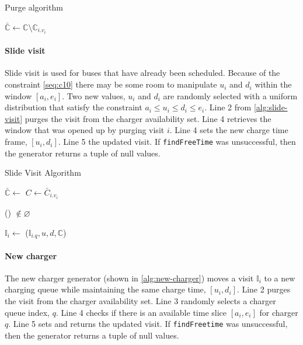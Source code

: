 \documentclass[11pt,a4paper,final]{article}
\newcommand{\I}{\mathbb{I}}                 %
\newcommand{\C}{\mathbb{C}}                 %
\newcommand{\Sol}{\mathbb{S}}               %
\begin{document}
\begin{algorithm}[H]
  \caption{Purge algorithm} \label{alg:purge}
    \LinesNumbered
    \KwIn{$\Sol$}
    \KwOut{$\bar{\Sol}$}

    \Begin
    {
        $\bar{\C} \leftarrow \C \setminus \C_{i.v_i}$
        \Return{$\bar{\C}$}
    }
  \end{algorithm}

\paragraph{Slide visit}
\label{slide-visit}
Slide visit is used for buses that have already been scheduled. Because of the constraint \ref{seq:c10} there may be
some room to manipulate \(u_i\) and \(d_i\) within the window \([a_i, e_i]\). Two new values, \(u_i\) and \(d_i\) are randomly
selected with a uniform distribution that satisfy the constraint \(a_i \leq u_i \leq d_i \leq e_i\). Line 2 from
\ref{alg:slide-visit} purges the visit from the charger availability set. Line 4 retrieves the window that was opened up
by purging visit \(i\). Line 4 sets the new charge time frame, \([u_i, d_i]\). Line 5 the updated visit. If \texttt{findFreeTime}
was unsuccessful, then the generator returns a tuple of null values.

\begin{algorithm}[H]
\caption{Slide Visit Algorithm} \label{alg:slide-visit}
    \LinesNumbered
    \KwIn{$\Sol$}
    \KwOut{$\bar{\Sol}$}


    \Begin
    {
      $\bar{\C} \leftarrow$\Purge{$\Sol$}
      $C \leftarrow \bar{C}_{i.v_i}$

        \If(){ $\not\in \varnothing$}
        {
          \Return{($\I_{i.q},\bar{u},\bar{d},\bar{C}$)}
        }

        $\I_i \leftarrow$ ($\I_{i.q},u,d,\C$)
        \Return{($\varnothing$)}
    }
  \end{algorithm}

\paragraph{New charger}
\label{new-charger}
The new charger generator (shown in \ref{alg:new-charger}) moves a visit \(\I_i\) to a new charging queue while
maintaining the same charge time, \([u_i, d_i]\). Line 2 purges the visit from the charger availability set. Line 3
randomly selects a charger queue index, \(q\). Line 4 checks if there is an available time slice \([a_i, e_i]\) for charger
\(q\). Line 5 sets and returns the updated visit. If \texttt{findFreetime} was unsuccessful, then the generator returns a tuple
of null values.
\end{document}
